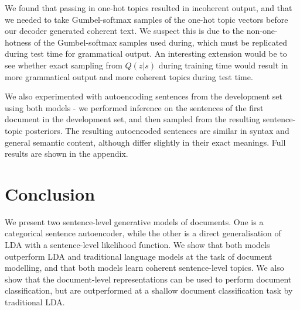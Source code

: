 We found that passing in one-hot topics resulted in incoherent output, and that we needed to take Gumbel-softmax samples of the one-hot topic vectors before our decoder generated coherent text. We suspect this is due to the non-one-hotness of the Gumbel-softmax samples used during, which must be replicated during test time for grammatical output. An interesting extension would be to see whether exact sampling from $Q(z|s)$ during training time would result in more grammatical output and more coherent topics during test time.

We also experimented with autoencoding sentences from the development set using both models - we performed inference on the sentences of the first document in the development set, and then sampled from the resulting sentence-topic posteriors. The resulting autoencoded sentences are similar in syntax and general semantic content, although differ slightly in their exact meanings. Full results are shown in the appendix.

\section{Conclusion}

We present two sentence-level generative models of documents. One is a categorical sentence autoencoder, while the other is a direct generalisation of LDA with a sentence-level likelihood function. We show that both models outperform LDA and traditional language models at the task of document modelling, and that both models learn coherent sentence-level topics. We also show that the document-level representations can be used to perform document classification, but are outperformed at a shallow document classification task by traditional LDA.